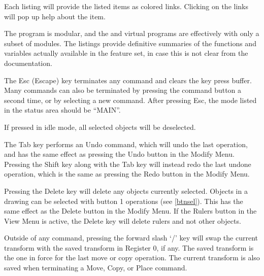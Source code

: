 Each listing will provide the listed items as colored links.  Clicking
on the links will pop up help about the item.

The {\Xic} program is modular, and the {\XicII} and {\Xiv} virtual
programs are effectively {\Xic} with only a subset of modules.  The
listings provide definitive summaries of the functions and variables
actually available in the feature set, in case this is not clear from
the documentation.

The {\kb Esc} (Escape) key terminates any command and clears the key
press buffer.  Many commands can also be terminated by pressing the
command button a second time, or by selecting a new command.  After
pressing {\kb Esc}, the {\et mode} listed in the status area should be
``{\vt MAIN}''.

If pressed in idle mode, all selected objects will be deselected.

The {\kb Tab} key performs an {\cb Undo} command, which will undo the
last operation, and has the same effect as pressing the {\cb Undo}
button in the {\cb Modify Menu}.  Pressing the {\kb Shift} key along
with the {\kb Tab} key will instead redo the last undone operation,
which is the same as pressing the {\cb Redo} button in the {\cb Modify
Menu}. 

Pressing the {\kb Delete} key will delete any objects currently
selected.  Objects in a drawing can be selected with button 1
operations (see \ref{btnsel}).  This has the same effect as the {\cb
Delete} button in the {\cb Modify Menu}.  If the {\cb Rulers} button in
the {\cb View Menu} is active, the {\kb Delete} key will delete rulers
and not other objects.

Outside of any command, pressing the forward slash `{\cb /}' key will
swap the current transform with the saved transform in Register 0, if
any.  The saved transform is the one in force for the last move or copy
operation.  The current transform is also saved when
terminating a {\cb Move}, {\cb Copy}, or {\cb Place} command.

